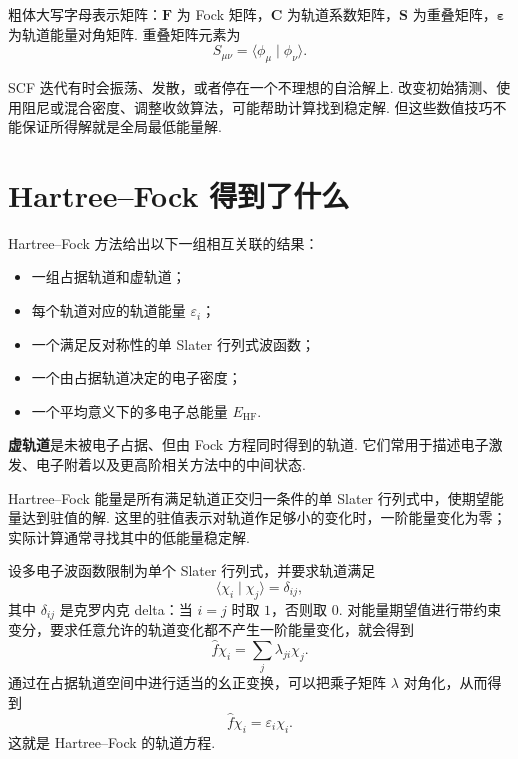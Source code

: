 \documentclass[UTF8,11pt,a4paper,openany]{ctexbook}
\newcommand{\braket}[2]{\langle #1\mid #2\rangle}\newcommand{\ii}{\mathrm i}
\newcommand{\term}[1]{\textbf{#1}}
\begin{document}
\begin{notationbox}
粗体大写字母表示矩阵：$\mathbf F$ 为 Fock 矩阵，$\mathbf C$ 为轨道系数矩阵，$\mathbf S$ 为重叠矩阵，$\boldsymbol{\varepsilon}$ 为轨道能量对角矩阵. 重叠矩阵元素为
\[
S_{\mu\nu}=\braket{\phi_\mu}{\phi_\nu}.
\]
\end{notationbox}

\begin{limitbox}
SCF 迭代有时会振荡、发散，或者停在一个不理想的自洽解上. 改变初始猜测、使用阻尼或混合密度、调整收敛算法，可能帮助计算找到稳定解. 但这些数值技巧不能保证所得解就是全局最低能量解. 
\end{limitbox}

\section{Hartree--Fock 得到了什么}

Hartree--Fock 方法给出以下一组相互关联的结果：

\begin{itemize}
\item 一组占据轨道和虚轨道；
\item 每个轨道对应的轨道能量 $\varepsilon_i$；
\item 一个满足反对称性的单 Slater 行列式波函数；
\item 一个由占据轨道决定的电子密度；
\item 一个平均意义下的多电子总能量 $E_{\mathrm{HF}}$. 
\end{itemize}

\term{虚轨道}是未被电子占据、但由 Fock 方程同时得到的轨道. 它们常用于描述电子激发、电子附着以及更高阶相关方法中的中间状态. 

\begin{definitionbox}
Hartree--Fock 能量是所有满足轨道正交归一条件的单 Slater 行列式中，使期望能量达到驻值的解. 这里的驻值表示对轨道作足够小的变化时，一阶能量变化为零；实际计算通常寻找其中的低能量稳定解. 
\end{definitionbox}

\begin{derivationbox}
设多电子波函数限制为单个 Slater 行列式，并要求轨道满足
\[
\braket{\chi_i}{\chi_j}=\delta_{ij},
\]
其中 $\delta_{ij}$ 是克罗内克 delta：当 $i=j$ 时取 $1$，否则取 $0$. 对能量期望值进行带约束变分，要求任意允许的轨道变化都不产生一阶能量变化，就会得到
\[
\hat f\chi_i=\sum_j\lambda_{ji}\chi_j.
\]
通过在占据轨道空间中进行适当的幺正变换，可以把乘子矩阵 $\lambda$ 对角化，从而得到
\[
\hat f\chi_i=\varepsilon_i\chi_i.
\]
这就是 Hartree--Fock 的轨道方程. 
\end{derivationbox}
\end{document}

